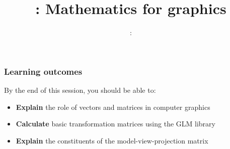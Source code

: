 \usepackage{../../beamerthemeFalmouthGamesAcademy}
\usepackage{multimedia}
\graphicspath{ {../../} }




\usepackage[normalem]{ulem}
\usepackage{wasysym}

\usepackage{pdfpages}

\usetikzlibrary{arrows,automata}




\title{\sessionnumber: Mathematics for graphics}
\subtitle{\modulecode: \moduletitle}

\frame{\titlepage} 

\begin{frame}
	\frametitle{Learning outcomes}
	By the end of this session, you should be able to:
	\begin{itemize}
		\item \textbf{Explain} the role of vectors and matrices in computer graphics
		\item \textbf{Calculate} basic transformation matrices using the GLM library
		\item \textbf{Explain} the constituents of the model-view-projection matrix
	\end{itemize}
\end{frame}







